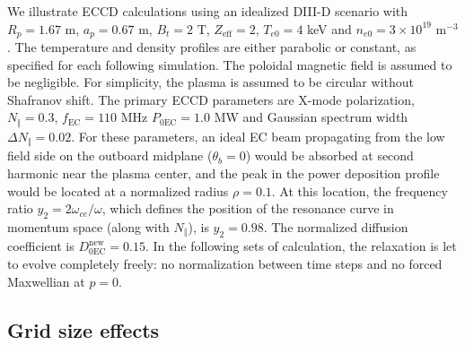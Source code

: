 We illustrate ECCD calculations using an idealized DIII-D scenario with
$R_{p}=1.67$ m, $a_{p}=0.67$ m, $B_{t}=2$ T, $Z_{\text{eff}}=2$, $T_{e0}=4$
keV and $n_{e0}=3\times10^{19}$ m$^{-3}$. The temperature and density profiles
are either parabolic or constant, as specified for each following simulation.
The poloidal magnetic field is assumed to be negligible. For simplicity, the
plasma is assumed to be circular without Shafranov shift. The primary ECCD
parameters are X-mode polarization, $N_{\Vert}=0.3$, $f_{\text{EC}}=110$ MHz
$P_{0\text{EC}}=1.0$ MW and Gaussian spectrum width $\Delta N_{\Vert}=0.02$.
For these parameters, an ideal EC beam propagating from the low field side on
the outboard midplane ($\theta_{b}=0$) would be absorbed at second harmonic
near the plasma center, and the peak in the power deposition profile would be
located at a normalized radius $\rho=0.1$. At this location, the frequency
ratio $y_{2}=2\omega_{ce}/\omega$, which defines the position of the resonance
curve in momentum space (along with $N_{\Vert}$), is $y_{2}=0.98$. The
normalized diffusion coefficient is $D_{0\text{EC}}^{\text{new}}=0.15$. In the
following sets of calculation, the relaxation is let to evolve completely
freely: no normalization between time steps and no forced Maxwellian at $p=0$.

\subsection{\bigskip Grid size effects}


